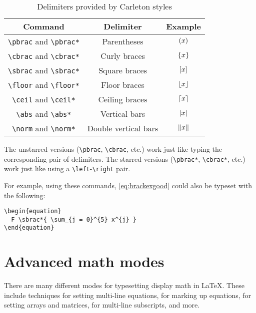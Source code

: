 \documentclass{article}
\newcommand*{\code}[1]{\texttt{#1}}
\begin{document}
\begin{table}[htb]
  \centering
  \begin{tabular}{c c c}
    \toprule
    Command & Delimiter & Example \\ \midrule
    \code{\textbackslash{}pbrac} and \code{\textbackslash{}pbrac*} & Parentheses & $(x)$ \\
    \code{\textbackslash{}cbrac} and \code{\textbackslash{}cbrac*} & Curly braces & $\{x\}$ \\
    \code{\textbackslash{}sbrac} and \code{\textbackslash{}sbrac*} & Square braces & $[x]$ \\
    \code{\textbackslash{}floor} and \code{\textbackslash{}floor*} & Floor braces & $\lfloor x\rfloor$ \\
    \code{\textbackslash{}ceil} and \code{\textbackslash{}ceil*} & Ceiling braces & $\lceil x\rceil$ \\
    \code{\textbackslash{}abs} and \code{\textbackslash{}abs*} & Vertical bars & $\lvert x\rvert$ \\
    \code{\textbackslash{}norm} and \code{\textbackslash{}norm*} & Double vertical bars & $\lVert x\rVert$ \\
    \bottomrule
  \end{tabular}
  \caption{Delimiters provided by Carleton styles}
  \label{tab:delim}
\end{table}

The unstarred versions (\code{\textbackslash{}pbrac}, \code{\textbackslash{}cbrac}, etc.) work just like typing the corresponding pair of delimiters.
The starred versions (\code{\textbackslash{}pbrac*}, \code{\textbackslash{}cbrac*}, etc.) work just like using a \code{\textbackslash{}left}-\code{\textbackslash{}right} pair.

For example, using these commands, \cref{eq:brackexgood} could also be typeset with the following:
\begin{verbatim}
\begin{equation}
  F \sbrac*{ \sum_{j = 0}^{5} x^{j} }
\end{equation}
\end{verbatim}

\section{Advanced math modes}
There are many different modes for typesetting display math in \LaTeX{}.
These include techniques for setting multi-line equations, for marking up equations, for setting arrays and matrices, for multi-line subscripts, and more.
\end{document}
